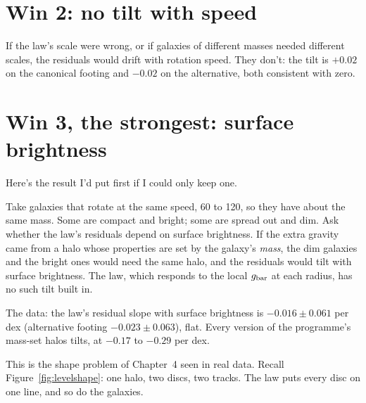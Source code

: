 
\section{Win 2: no tilt with speed}

If the law's scale were wrong, or if galaxies of different masses needed different scales, the residuals would drift with rotation speed. They don't: the tilt is $+0.02$ on the canonical footing and $-0.02$ on the alternative, both consistent with zero.

\section{Win 3, the strongest: surface brightness}

Here's the result I'd put first if I could only keep one.

Take galaxies that rotate at the same speed, 60 to 120\kms, so they have about the same mass. Some are compact and bright; some are spread out and dim. Ask whether the law's residuals depend on surface brightness. If the extra gravity came from a halo whose properties are set by the galaxy's \emph{mass}, the dim galaxies and the bright ones would need the same halo, and the residuals would tilt with surface brightness. The law, which responds to the local $g_{\rm bar}$ at each radius, has no such tilt built in.

The data: the law's residual slope with surface brightness is $\mathbf{-0.016\pm0.061}$ per dex (alternative footing $-0.023\pm0.063$), flat. Every version of the programme's mass-set halos tilts, at $-0.17$ to $-0.29$ per dex.


This is the shape problem of Chapter~4 seen in real data. Recall Figure~\ref{fig:levelshape}: one halo, two discs, two tracks. The law puts every disc on one line, and so do the galaxies.

